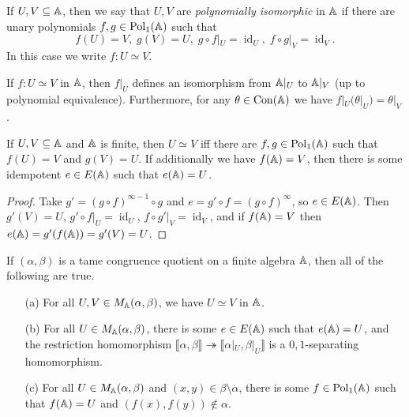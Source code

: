 \begin{appendices}
\begin{defn} If $U,V \subseteq \mathbb{A}$, then we say that $U,V$ are \emph{polynomially isomorphic} in $\mathbb{A}$ if there are unary polynomials $f,g \in \operatorname{Pol}_1(\mathbb{A})$ such that
\[
f(U) = V, \; g(V) = U, \; g\circ f|_U = \operatorname{id}_U, \; f\circ g|_V = \operatorname{id}_V.
\]
In this case we write $f : U \simeq V$.
\end{defn}

\begin{prop} If $f : U \simeq V$ in $\mathbb{A}$, then $f|_U$ defines an isomorphism from $\mathbb{A}|_U$ to $\mathbb{A}|_V$ (up to polynomial equivalence). Furthermore, for any $\theta \in \operatorname{Con}(\mathbb{A})$ we have $f|_U(\theta|_U) = \theta|_V$.
\end{prop}

\begin{prop} If $U,V \subseteq \mathbb{A}$ and $\mathbb{A}$ is finite, then $U \simeq V$ iff there are $f, g \in \operatorname{Pol}_1(\mathbb{A})$ such that $f(U) = V$ and $g(V) = U$. If additionally we have $f(\mathbb{A}) = V$, then there is some idempotent $e \in E(\mathbb{A})$ such that $e(\mathbb{A}) = U$.
\end{prop}
\begin{proof} Take $g' = (g \circ f)^{\infty - 1}\circ g$ and $e = g' \circ f = (g \circ f)^{\infty}$, so $e \in E(\mathbb{A})$. Then $g'(V) = U$, $g'\circ f|_U = \operatorname{id}_U$, $f\circ g'|_V = \operatorname{id}_V$, and if $f(\mathbb{A}) = V$ then $e(\mathbb{A}) = g'(f(\mathbb{A})) = g'(V) = U$.
\end{proof}

\begin{thm}\label{thm-minimal-sets} If $(\alpha,\beta)$ is a tame congruence quotient on a finite algebra $\mathbb{A}$, then all of the following are true.
\begin{itemize}
\item[(a)] For all $U,V \in M_{\mathbb{A}}(\alpha,\beta)$, we have $U \simeq V$ in $\mathbb{A}$.

\item[(b)] For all $U \in M_{\mathbb{A}}(\alpha,\beta)$, there is some $e \in E(\mathbb{A})$ such that $e(\mathbb{A}) = U$, and the restriction homomorphism $\llbracket \alpha, \beta \rrbracket \twoheadrightarrow \llbracket \alpha|_U, \beta|_U \rrbracket$ is a $0,1$-separating homomorphism.

\item[(c)] For all $U \in M_{\mathbb{A}}(\alpha, \beta)$ and $(x,y) \in \beta\setminus\alpha$, there is some $f \in \operatorname{Pol}_1(\mathbb{A})$ such that $f(\mathbb{A}) = U$ and $(f(x),f(y)) \not\in \alpha$.


\end{itemize}
\end{thm}
\end{appendices}
